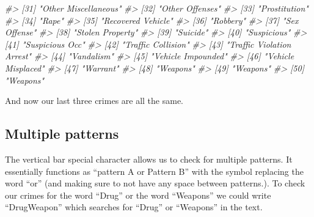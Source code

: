 \documentclass[
]{krantz}
\makeatletter
\newenvironment{Shaded}{\begin{snugshade}}{\end{snugshade}}
\newcommand{\CommentTok}[1]{\textcolor[rgb]{0.37,0.37,0.37}{\textit{#1}}}
\newenvironment{kframe}{%
\medskip{}
\setlength{\fboxsep}{.8em}
 \def\at@end@of@kframe{}%
 \ifinner\ifhmode%
  \def\at@end@of@kframe{\end{minipage}}%
  \begin{minipage}{\columnwidth}%
 \fi\fi%
 \def\FrameCommand##1{\hskip\@totalleftmargin \hskip-\fboxsep
 \colorbox{shadecolor}{##1}\hskip-\fboxsep
     \hskip-\linewidth \hskip-\@totalleftmargin \hskip\columnwidth}%
 \MakeFramed {\advance\hsize-\width
   \@totalleftmargin\z@ \linewidth\hsize
   \@setminipage}}%
 {\par\unskip\endMakeFramed%
 \at@end@of@kframe}
\renewenvironment{Shaded}{\begin{kframe}}{\end{kframe}}
\makeatother
\begin{document}
\begin{Shaded}
\begin{Highlighting}[]
\CommentTok{\#\textgreater{} [31] "Other Miscellaneous"                       }
\CommentTok{\#\textgreater{} [32] "Other Offenses"                            }
\CommentTok{\#\textgreater{} [33] "Prostitution"                              }
\CommentTok{\#\textgreater{} [34] "Rape"                                      }
\CommentTok{\#\textgreater{} [35] "Recovered Vehicle"                         }
\CommentTok{\#\textgreater{} [36] "Robbery"                                   }
\CommentTok{\#\textgreater{} [37] "Sex Offense"                               }
\CommentTok{\#\textgreater{} [38] "Stolen Property"                           }
\CommentTok{\#\textgreater{} [39] "Suicide"                                   }
\CommentTok{\#\textgreater{} [40] "Suspicious"                                }
\CommentTok{\#\textgreater{} [41] "Suspicious Occ"                            }
\CommentTok{\#\textgreater{} [42] "Traffic Collision"                         }
\CommentTok{\#\textgreater{} [43] "Traffic Violation Arrest"                  }
\CommentTok{\#\textgreater{} [44] "Vandalism"                                 }
\CommentTok{\#\textgreater{} [45] "Vehicle Impounded"                         }
\CommentTok{\#\textgreater{} [46] "Vehicle Misplaced"                         }
\CommentTok{\#\textgreater{} [47] "Warrant"                                   }
\CommentTok{\#\textgreater{} [48] "Weapons"                                   }
\CommentTok{\#\textgreater{} [49] "Weapons"                                   }
\CommentTok{\#\textgreater{} [50] "Weapons"}
\end{Highlighting}
\end{Shaded}

And now our last three crimes are all the same.

\hypertarget{multiple-patterns}{%
\subsection{\texorpdfstring{Multiple patterns \texttt{\textbar{}}}{Multiple patterns \textbar{}}}\label{multiple-patterns}}

The vertical bar \texttt{\textbar{}} special character allows us to check for multiple patterns. It essentially functions as ``pattern A or Pattern B'' with the \texttt{\textbar{}} symbol replacing the word ``or'' (and making sure to not have any space between patterns.). To check our crimes for the word ``Drug'' or the word ``Weapons'' we could write ``Drug\textbar Weapon'' which searches for ``Drug'' or ``Weapons'' in the text.
\end{document}
